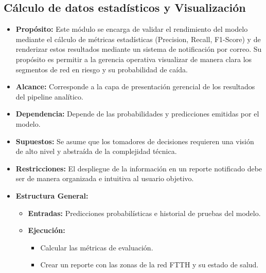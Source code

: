 \documentclass[12pt,a4paper]{article}
\begin{document}
    \subsection{Cálculo de datos estadísticos y Visualización}
    \begin{itemize}
        \item \textbf{Propósito:} Este módulo se encarga de validar el rendimiento del modelo mediante el cálculo de métricas estadísticas (Precision, Recall, F1-Score) y de renderizar estos
        resultados mediante un sistema de notificación por correo. Su propósito es permitir a la gerencia operativa visualizar de manera clara los segmentos de red en riesgo y su probabilidad de caída.
        \item \textbf{Alcance:} Corresponde a la capa de presentación gerencial de los resultados del pipeline analítico.
        \item \textbf{Dependencia:} Depende de las probabilidades y predicciones emitidas por el modelo.
        \item \textbf{Supuestos:} Se asume que los tomadores de decisiones requieren una visión de alto nivel y abstraída de la complejidad técnica.
        \item \textbf{Restricciones:} El despliegue de la información en un reporte notificado debe ser de manera organizada e intuitiva al usuario objetivo.
        \item \textbf{Estructura General:} 
        \begin{itemize}
            \item \textbf{Entradas:} Predicciones probabilísticas e historial de pruebas del modelo.
            \item \textbf{Ejecución:} 
            \begin{itemize}
                \item Calcular las métricas de evaluación.
                \item Crear un reporte con las zonas de la red FTTH y su estado de salud. 
            \end{itemize} 
        \end{itemize}
    \end{itemize}
\end{document}
